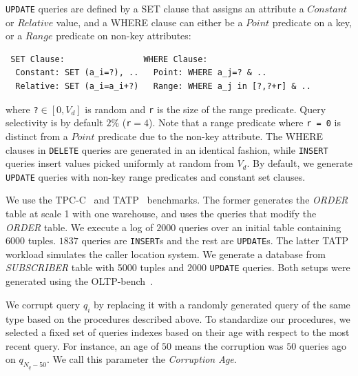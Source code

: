 \texttt{UPDATE} queries are defined by a SET clause that assigns an attribute a $Constant$ or $Relative$ value,
and a WHERE clause can either be a $Point$ predicate on a key, or a $Range$ predicate on non-key attributes:

\begin{scriptsize}
\begin{verbatim}
 SET Clause:                WHERE Clause:
  Constant: SET (a_i=?), ..   Point: WHERE a_j=? & ..
  Relative: SET (a_i=a_i+?)   Range: WHERE a_j in [?,?+r] & ..\end{verbatim}
\end{scriptsize}
\noindent where \verb|?|$\in [0, V_d]$ is random and \verb|r| is the size of the range predicate. 
Query selectivity is by default $2\%$ (\verb|r|$=4$).
Note that a range predicate where \texttt{r = 0} is distinct from a $Point$ predicate due to the non-key attribute.
The WHERE clauses in \texttt{DELETE} queries are generated in an identical fashion, while
\texttt{INSERT} queries insert values picked uniformly at random from $V_d$.
By default, we generate \texttt{UPDATE} queries with non-key range predicates and constant set clauses.
  


 We use the TPC-C~\cite{tpcc} and TATP~\cite{tatp} benchmarks.
The former generates the {\it ORDER} table at scale 1 with one warehouse, and uses the queries that modify the {\it ORDER} table. 
We execute a log of $2000$ queries over an initial table containing 6000 tuples.  
$1837$ queries are \texttt{INSERT}s and the rest are \texttt{UPDATE}s. 
The latter TATP workload simulates the caller location system. 
We generate a database from {\it SUBSCRIBER} table with 5000 tuples and $2000$ \texttt{UPDATE} queries.
Both setups were generated using the OLTP-bench~\cite{oltpbench}. 



 We corrupt query $q_i$ by replacing it with a randomly
generated query of the same type based on the procedures described above.
To standardize our procedures, we selected a fixed set of queries indexes based on their age with respect to the most recent query.
For instance, an age of $50$ means the corruption was $50$ queries ago on $q_{N_q-50}$.
We call this parameter the {\it Corruption Age}.

